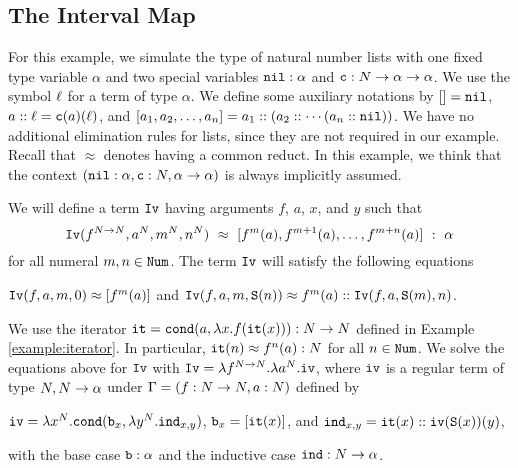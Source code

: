 \subsection{The Interval Map}\label{subsection-interval}

For this example, we simulate the type of natural number lists
with one fixed type variable $\alpha$
and two special variables ${\tt nil}:\alpha$ and ${\tt c}:{N} \rightarrow \alpha \rightarrow \alpha$. 
We use the symbol $\ell$ for a term of type $\alpha$. 
We define some auxiliary notations by $[]={\tt nil}$,
$a::\ell = {\tt c}(a)(\ell)$, and
$[a_1,a_2,\ldots,a_n] = a_1::(a_2::\cdots (a_n::{\tt nil}))$.
We have no additional elimination rules for lists, since 
they are not required in our example.
Recall that $\approx$ denotes having a common reduct.
In this example, we think that the context
$({\tt nil}:\alpha, {\tt c}:{N},\alpha \rightarrow \alpha)$
is always implicitly assumed. 

\begin{example}\label{example:interval}
We will define a term ${\tt Iv}$ having arguments
$f$, $a$, $x$, and $y$ such that 
\[
\Interval(f^{\N\rightarrow\N},a^{\N},m^{\N},n^{\N})\ \approx \ [f^m(a), f^{m+1}(a), \ldots, f^{m+n}(a)] \  : \ \alpha
\]
for all numeral $m,n \in {\tt Num}$.
The term ${\tt Iv}$ will satisfy the following equations
\begin{center}
  ${\tt Iv}(f,a,m,0) \approx [f^m(a)]$
  \quad
  and
  \quad
  ${\tt Iv}(f,a,m,{\tt S}(n))  \approx f^m(a)::{\tt Iv}(f,a,{\tt S}(m),n)$.
\end{center}
We use the iterator ${\tt it} = {\tt cond} (a, \lambda x.f({\tt it}(x))):{N} \rightarrow {N}$ defined in Example \ref{example:iterator}. 
In particular, ${\tt it}(n) \approx f^n(a) : {N}$ for all $n \in {\tt Num}$.
We solve the equations above for ${\tt Iv}$ with 
${\tt Iv} = \lambda f^{{N}\rightarrow{N}}. \lambda a^{N}.{\tt iv}$,
where ${\tt iv}$ is a regular term of type ${N},{N}\rightarrow\alpha$
under $\Gamma = (f:{N}\rightarrow{N},a:{N})$ defined by
\begin{center}
  ${\tt iv} 
  = 
  \lambda x^{N}.{\tt cond} ({\tt b}_x, \lambda y^{N}.{\tt ind}_{x,y})$, 
  \quad
  ${\tt b}_x
  = 
  [{\tt it}(x)]$, 
  \hspace{3ex}
  and
  \hspace{3ex}  
  ${\tt ind}_{x,y}
  = 
  {\tt it}(x) :: {\tt iv}({\tt S}(x))(y)$, 
\end{center}
with the base case ${\tt b}:\alpha$ and the inductive case ${\tt ind}:{N}\rightarrow\alpha$. 


\end{example}

